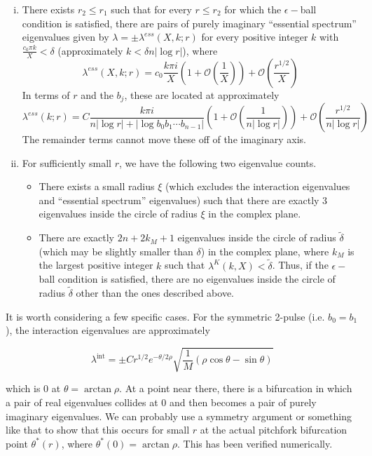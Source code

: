 \documentclass[thesis.tex]{subfiles}
\begin{document}
\begin{theorem}
\begin{enumerate}[(i)]
\item There exists $r_2 \leq r_1$ such that for every $r \leq r_2$ for which the $\epsilon-$ball condition is satisfied, there are pairs of purely imaginary ``essential spectrum'' eigenvalues given by $\lambda = \pm \lambda^{ess}(X,k; r)$ for every positive integer $k$ with $\frac{c_0 \pi k}{X} < \delta$ (approximately $k < \delta n |\log r|$), where
\begin{equation}\label{lambdaess}
\lambda^{ess}(X, k; r) = c_0 \frac{k \pi i }{X} \left( 1 + \mathcal{O}\left( \frac{1}{X} \right)\right) + \mathcal{O}\left( \frac{r^{1/2}}{X} \right)
\end{equation}
In terms of $r$ and the $b_j$, these are located at approximately
\begin{equation}\label{lambdaessr}
\lambda^{ess}(k; r) = C \frac{k \pi i }{n |\log r| + |\log b_0 b_1 \cdots b_{n-1}|}  \left( 1 + \mathcal{O}\left( \frac{1}{n |\log r|} \right)\right) + \mathcal{O}\left( \frac{r^{1/2}}{n |\log r|} \right)
\end{equation}
The remainder terms cannot move these off of the imaginary axis.

\item For sufficiently small $r$, we have the following two eigenvalue counts.

\begin{itemize}
	\item There exists a small radius $\xi$ (which excludes the interaction eigenvalues and ``essential spectrum'' eigenvalues) such that there are exactly 3 eigenvalues inside the circle of radius $\xi$ in the complex plane.

	\item There are exactly $2n + 2 k_M + 1$ eigenvalues inside the circle of radius $\tilde{\delta}$ (which may be slightly smaller than $\delta$) in the complex plane, where $k_M$ is the largest positive integer $k$ such that $\lambda^K(k,X) < \tilde{\delta}$. Thus, if the $\epsilon-$ball condition is satisfied, there are no eigenvalues inside the circle of radius $\tilde{\delta}$ other than the ones described above.
\end{itemize}
\end{enumerate}

\end{theorem}

It is worth considering a few specific cases. For the symmetric 2-pulse (i.e. $b_0 = b_1$), the interaction eigenvalues are approximately

\[
\lambda^{\text{int}} = \pm C r^{1/2} e^{-\theta/2\rho} \sqrt{ \frac{1}{M} \left( \rho \cos \theta - \sin \theta \right) }
\]

which is 0 at $\theta = \arctan \rho$. At a point near there, there is a bifurcation in which a pair of real eigenvalues collides at 0 and then becomes a pair of purely imaginary eigenvalues. We can probably use a symmetry argument or something like that to show that this occurs for small $r$ at the actual pitchfork bifurcation point $\theta^*(r)$, where $\theta^*(0) = \arctan \rho$. This has been verified numerically.

% 
% 
\end{document}
